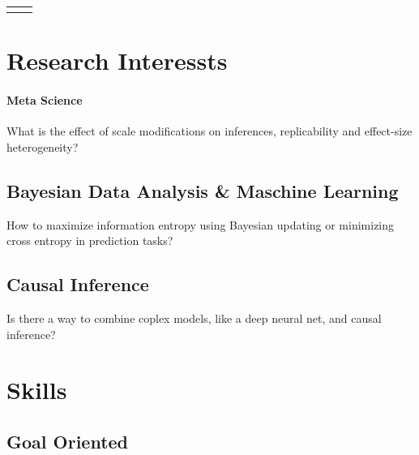 \documentclass[10pt]{FreemanCV}
\begin{document}
\begin{paracol}{2}
\begin{supertabular}{r l}



	
\end{supertabular}


\section{Research Interessts}

\paragraph{Meta Science}
What is the effect of scale modifications on inferences, replicability and
effect-size heterogeneity?

\subsection{Bayesian Data Analysis \& Maschine Learning}
How to maximize information entropy using Bayesian updating
or minimizing cross entropy in prediction tasks?

\subsection{Causal Inference}
Is there a way to combine coplex models, like a deep neural net, and causal
inference?


\section{Skills}

\subsection{Goal Oriented}


\end{paracol}
\end{document}
